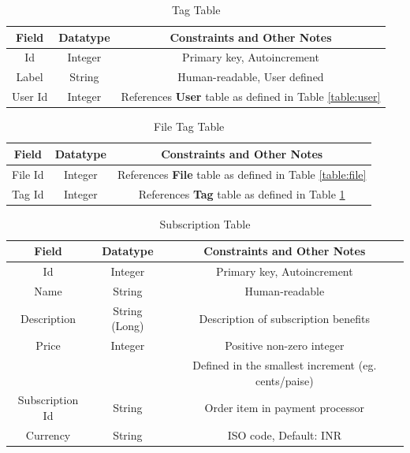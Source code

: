 \documentclass[12pt,a4paper]{report}
\newcommand{\sqlref}[2]{References \textbf{#2} table as defined in Table \ref{#1}}
\begin{document}
\begin{table}[h!]
	\centering
	\caption{Tag Table}
	\begin{tabular}{|c|c|c|}
		\hline
		\textbf{Field} & \textbf{Datatype} & \textbf{Constraints and Other Notes} \\
		\hline
		Id             & Integer           & Primary key, Autoincrement           \\
		\hline
		Label          & String            & Human-readable, User defined         \\
		\hline
		User Id        & Integer           & \sqlref{table:user}{User}            \\
		\hline
	\end{tabular}
	\label{table:tag}
\end{table}
\begin{table}[h!]
	\centering
	\caption{File Tag Table}
	\begin{tabular}{|c|c|c|}
		\hline
		\textbf{Field} & \textbf{Datatype} & \textbf{Constraints and Other Notes} \\
		\hline
		File Id        & Integer           & \sqlref{table:file}{File}            \\
		\hline
		Tag Id         & Integer           & \sqlref{table:tag}{Tag}              \\
		\hline
	\end{tabular}
	\label{table:file-tag}
\end{table}
\begin{table}[h!]
	\centering
	\caption{Subscription Table}
	\begin{tabular}{|c|c|c|}
		\hline
		\textbf{Field}  & \textbf{Datatype} & \textbf{Constraints and Other Notes}                \\
		\hline
		Id              & Integer           & Primary key, Autoincrement                          \\
		\hline
		Name            & String            & Human-readable                                      \\
		\hline
		Description     & String (Long)     & Description of subscription benefits                \\
		\hline
		Price           & Integer           & Positive non-zero integer                           \\
		                &                   & Defined in the smallest increment (eg. cents/paise) \\
		\hline
		Subscription Id & String            & Order item in payment processor                     \\
		\hline
		Currency        & String            & ISO code, Default: INR                              \\
		\hline
	\end{tabular}
	\label{table:subscription}
\end{table}
\end{document}
